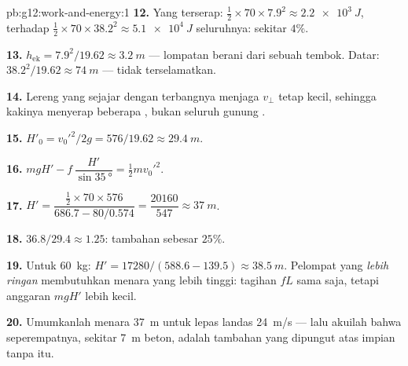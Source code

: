 \begin{solution}{pb:g12:work-and-energy:1}
\textbf{12.} Yang terserap: $\tfrac12 \times 70 \times 7.9^2 \approx
\qty{2.2e3}{J}$, terhadap $\tfrac12 \times 70 \times 38.2^2 \approx
\qty{5.1e4}{J}$ seluruhnya: sekitar $4\%$.

\textbf{13.} $h_{\text{ek}} = 7.9^2/19.62 \approx \qty{3.2}{m}$ ---
lompatan berani dari sebuah tembok. Datar: $38.2^2/19.62 \approx \qty{74}{m}$ ---
tidak terselamatkan.

\textbf{14.} Lereng yang sejajar dengan  terbangnya menjaga $v_\perp$
tetap kecil, sehingga kakinya menyerap beberapa , bukan seluruh gunung .

\textbf{15.} $H'_0 = v_0'^2/2g = 576/19.62 \approx \qty{29.4}{m}$.

\textbf{16.} $mgH' - f\,\dfrac{H'}{\sin\qty{35}{\degree}} =
\tfrac12 m v_0'^2$.

\textbf{17.} $H' = \dfrac{\tfrac12 \times 70 \times 576}
{686.7 - 80/0.574} = \dfrac{\num{20160}}{547} \approx \qty{37}{m}$.

\textbf{18.} $36.8/29.4 \approx 1.25$: tambahan sebesar $25\%$.

\textbf{19.} Untuk \qty{60}{kg}: $H' = \num{17280}/(588.6 - 139.5)
\approx \qty{38.5}{m}$. Pelompat yang \emph{lebih ringan} membutuhkan menara
yang lebih tinggi: tagihan  $fL$ sama saja, tetapi anggaran 
$mgH'$ lebih kecil.

\textbf{20.} Umumkanlah menara \qty{37}{m} untuk lepas landas \qty{24}{m/s}
--- lalu akuilah bahwa seperempatnya, sekitar \qty{7}{m} beton,
adalah tambahan yang dipungut  atas impian tanpa  itu.
\end{solution}
